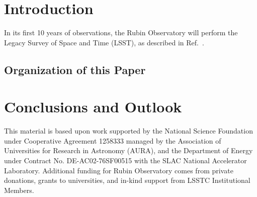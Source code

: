 \section{Introduction}

In its first 10 years of observations, the Rubin Observatory will perform the Legacy Survey of Space and Time (LSST), as described
in Ref.~. 

\subsection{Organization of this Paper}


\section{Conclusions and Outlook}
\label{sec:conclusions}


\acknowledgments
This material is based upon work supported by the National Science Foundation under Cooperative Agreement 1258333 managed by the Association of Universities for Research in Astronomy (AURA), and the Department of Energy under Contract No. DE-AC02-76SF00515 with the SLAC National Accelerator Laboratory. 
Additional funding for Rubin Observatory comes from private donations, grants to universities, and in-kind support from LSSTC Institutional Members.
